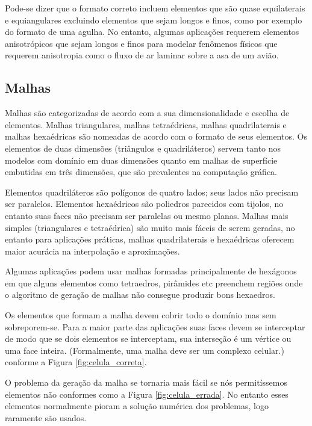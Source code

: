 Pode-se dizer que o formato correto incluem elementos que são quase equilaterais e equiangulares excluindo elementos que sejam longos e finos, como por exemplo do formato de uma agulha. No entanto, algumas aplicações requerem elementos anisotrópicos que sejam longos e finos para modelar fenômenos físicos que requerem anisotropia como o fluxo de ar laminar sobre a asa de um avião.

\subsection{Malhas}
Malhas são categorizadas de acordo com a sua dimensionalidade e escolha de elementos. Malhas triangulares, malhas tetraédricas, malhas quadrilaterais e malhas hexaédricas são nomeadas de acordo com o formato de seus elementos. Os elementos de duas dimensões (triângulos e quadriláteros) servem tanto nos modelos com domínio em duas dimensões quanto em malhas de superfície embutidas em três dimensões, que são prevalentes na computação gráfica.

Elementos quadriláteros são polígonos de quatro lados; seus lados não precisam ser paralelos. Elementos hexaédricos são poliedros parecidos com tijolos, no entanto suas faces não precisam ser paralelas ou mesmo planas. Malhas mais simples (triangulares e tetraédrica) são muito mais fáceis de serem geradas, no entanto para aplicações práticas, malhas quadrilaterais e hexaédricas oferecem maior acurácia na interpolação e aproximações.

Algumas aplicações podem usar malhas formadas principalmente de hexágonos em que alguns elementos como tetraedros, pirâmides etc preenchem regiões onde o algoritmo de geração de malhas não consegue produzir bons hexaedros.

Os elementos que formam a malha devem cobrir todo o domínio mas sem sobreporem-se. Para a maior parte das aplicações suas faces devem se interceptar de modo que se dois elementos se interceptam, sua interseção é um vértice ou uma face inteira. (Formalmente, uma malha deve ser um complexo celular.) conforme a Figura \ref{fig:celula_correta}.

O problema da geração da malha se tornaria mais fácil se nós permitíssemos elementos não conformes como a Figura \ref{fig:celula_errada}. No entanto esses elementos normalmente pioram a solução numérica dos problemas, logo raramente são usados.


